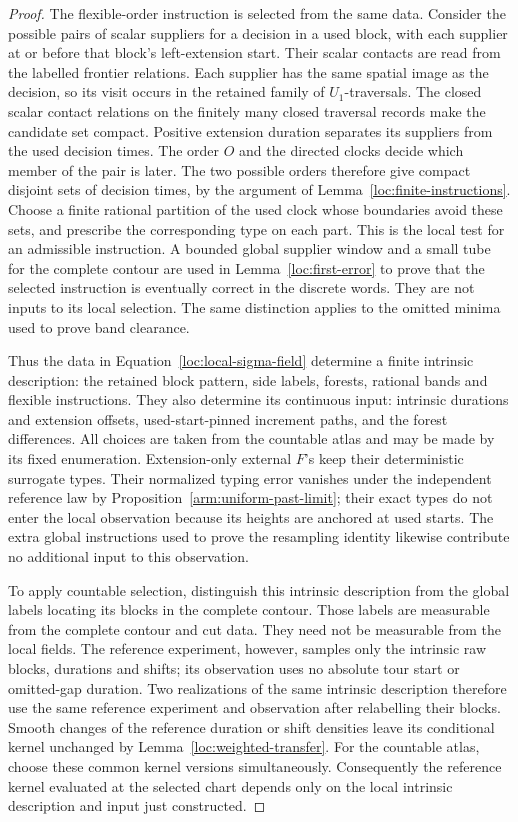 \begin{proof}
The flexible-order instruction is selected from the same data.  Consider
the possible pairs of scalar suppliers for a decision in a used block,
with each supplier at or before that block's left-extension start.  Their scalar
contacts are read from the labelled frontier relations.  Each supplier
has the same spatial image as the decision, so its visit occurs in the
retained family of $U_1$-traversals.  The closed scalar contact relations
on the finitely many closed traversal records make the candidate set
compact.  Positive extension duration separates its suppliers from
the used decision times.  The order $O$ and the directed clocks decide
which member of the pair is later.  The two possible orders therefore
give compact disjoint sets of decision times, by the argument of
Lemma~\ref{loc:finite-instructions}.  Choose a finite rational partition
of the used clock whose boundaries avoid these sets, and prescribe the
corresponding type on each part.  This is the local test for an
admissible instruction.  A bounded global supplier window and a small
tube for the complete contour are used in
Lemma~\ref{loc:first-error} to prove that the selected instruction is
eventually correct in the discrete words.  They are not inputs to its
local selection.  The same distinction applies to the omitted minima
used to prove band clearance.

Thus the data in Equation~\eqref{loc:local-sigma-field} determine a
finite intrinsic description: the retained block pattern, side labels,
forests, rational bands and flexible instructions.  They also determine
its continuous input: intrinsic durations and extension offsets,
used-start-pinned increment paths, and the forest differences.  All
choices are taken from the countable atlas and may be made by its fixed
enumeration.  Extension-only external $F$'s keep their deterministic
surrogate types.  Their normalized typing error vanishes under the
independent reference law by Proposition~\ref{arm:uniform-past-limit};
their exact types do not enter
the local observation because its heights are anchored at used starts.
The extra global instructions used to prove the resampling identity
likewise contribute no additional input to this observation.

To apply countable selection, distinguish this intrinsic description
from the global labels locating its blocks in the complete contour.
Those labels are measurable from the complete contour and cut data.
They need not be measurable from the local fields.  The reference
experiment, however, samples only the intrinsic raw blocks, durations
and shifts; its observation uses no absolute tour start or omitted-gap
duration.  Two realizations of the same intrinsic description therefore
use the same reference experiment and observation after relabelling
their blocks.  Smooth changes of the reference duration or shift
densities leave its conditional kernel unchanged by
Lemma~\ref{loc:weighted-transfer}.  For the countable atlas, choose
these common kernel versions simultaneously.  Consequently the
reference kernel evaluated at the selected chart depends only on the
local intrinsic description and input just constructed.


\end{proof}
